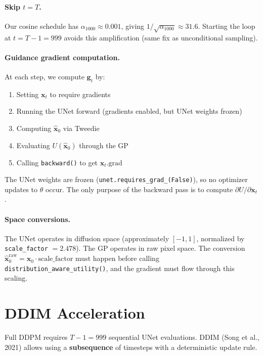 \documentclass[11pt]{article}
\newcommand{\xb}{\mathbf{x}}
\newcommand{\gb}{\mathbf{g}}
\begin{document}
\paragraph{Skip $t = T$.}
Our cosine schedule has $\alpha_{1000} \approx 0.001$, giving $1/\sqrt{\alpha_{1000}} \approx 31.6$.
Starting the loop at $t = T{-}1 = 999$ avoids this amplification (same fix as unconditional sampling).

\paragraph{Guidance gradient computation.}
At each step, we compute $\gb_t$ by:
\begin{enumerate}[nosep]
    \item Setting $\xb_t$ to require gradients
    \item Running the UNet forward (gradients enabled, but UNet weights frozen)
    \item Computing $\hat{\xb}_0$ via Tweedie
    \item Evaluating $U(\hat{\xb}_0)$ through the GP
    \item Calling \texttt{backward()} to get $\xb_t.\text{grad}$
\end{enumerate}

The UNet weights are frozen (\texttt{unet.requires\_grad\_(False)}), so no optimizer
updates to $\theta$ occur. The only purpose of the backward pass is to compute
$\partial U / \partial \xb_t$.

\paragraph{Space conversions.}
The UNet operates in diffusion space (approximately $[-1, 1]$, normalized by \texttt{scale\_factor} $= 2.478$).
The GP operates in raw pixel space. The conversion $\hat{\xb}_0^{\text{raw}} = \hat{\xb}_0 \cdot \text{scale\_factor}$
must happen before calling \texttt{distribution\_aware\_utility()}, and the gradient
must flow through this scaling.

\section{DDIM Acceleration}
\label{sec:ddim}

Full DDPM requires $T - 1 = 999$ sequential UNet evaluations. DDIM (Song et al., 2021)
allows using a \textbf{subsequence} of timesteps with a deterministic update rule.
\end{document}
